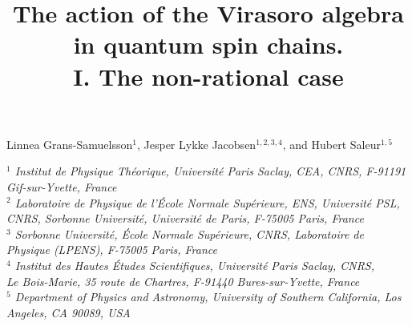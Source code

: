 \documentclass[a4paper,10pt]{article}
\newcommand{\linnea}[1]{$\framebox{\tiny L}$\ \textbf{\texttt{{\color{red}\footnotesize#1}}}}
\newcommand{\jesper}[1]{$\framebox{\tiny J}$\ \textbf{\texttt{{\color{cyan}\footnotesize#1}}}}
\begin{document}
\title{The action of the Virasoro algebra in quantum spin chains. \\ I. The non-rational case}
\date{}

\maketitle

\begin{center}

\vskip 1cm

{\large Linnea Grans-Samuelsson$^{1}$, Jesper Lykke Jacobsen$^{1,2,3,4}$,  and Hubert Saleur$^{1,5}$}

\vspace{1.0cm}
{\sl\small $^1$  Institut de Physique Th\'eorique, Universit\'e Paris Saclay, CEA, CNRS, F-91191 Gif-sur-Yvette, France\\}
{\sl\small $^2$ Laboratoire de Physique de l'\'Ecole Normale Sup\'erieure, ENS, Universit\'e PSL, \\
CNRS, Sorbonne Universit\'e, Universit\'e de Paris, F-75005 Paris, France\\}
{\sl\small $^3$ Sorbonne Universit\'e, \'Ecole Normale Sup\'erieure, CNRS,
Laboratoire de Physique (LPENS), F-75005 Paris, France\\}
{\sl\small $^4$ Institut des Hautes \'Etudes Scientifiques, Universit\'e Paris Saclay, CNRS, \\
Le Bois-Marie, 35 route de Chartres, F-91440 Bures-sur-Yvette, France\\}
{\sl\small $^5$ Department of Physics and Astronomy,
University of Southern California,
Los Angeles, CA 90089, USA\\}

\end{center}

\vskip 2cm

\end{document}
